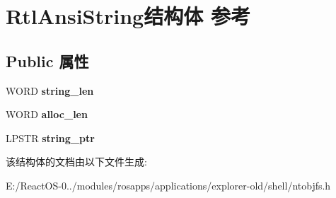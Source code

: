 \hypertarget{struct_rtl_ansi_string}{}\section{Rtl\+Ansi\+String结构体 参考}
\label{struct_rtl_ansi_string}
\subsection*{Public 属性}
\begin{DoxyCompactItemize}
\item 
\mbox{\label{struct_rtl_ansi_string_a9f3434b8e190befd4ca60239fb65efa8}} 
W\+O\+RD {\bfseries string\+\_\+len}
\item 
\mbox{\label{struct_rtl_ansi_string_a2d9f032569be9783c32a100fa8ec1b99}} 
W\+O\+RD {\bfseries alloc\+\_\+len}
\item 
\mbox{\label{struct_rtl_ansi_string_a6e26320c969c3ce016facb58cdab7455}} 
L\+P\+S\+TR {\bfseries string\+\_\+ptr}
\end{DoxyCompactItemize}


该结构体的文档由以下文件生成\+:\begin{DoxyCompactItemize}
\item 
E\+:/\+React\+O\+S-\/0../modules/rosapps/applications/explorer-\/old/shell/ntobjfs.\+h\end{DoxyCompactItemize}
